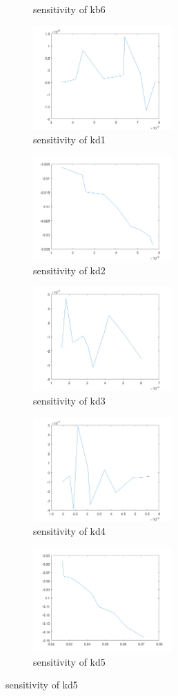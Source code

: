 \begin{figure}[H]
\begin{subfigure}{0.5\textwidth}
		\caption{sensitivity of kb6}
	\end{subfigure}%
	\begin{subfigure}{0.5\textwidth}
		\includegraphics[height=4cm]{d1.png}
		\caption{sensitivity of kd1}
	\end{subfigure}
	\begin{subfigure}{0.5\textwidth}
		\includegraphics[height=4cm]{d2.png}
		\caption{sensitivity of kd2}
	\end{subfigure}%
	\begin{subfigure}{0.5\textwidth}
		\includegraphics[height=4cm]{d3.png}
		\caption{sensitivity of kd3}
	\end{subfigure}
	\begin{subfigure}{0.5\textwidth}
		\includegraphics[height=4cm]{d4.png}
		\caption{sensitivity of kd4}
	\end{subfigure}%
	\begin{subfigure}{0.5\textwidth}
		\includegraphics[height=4cm]{d5.png}
		\caption{sensitivity of kd5}
	\end{subfigure}
\end{figure}
	
